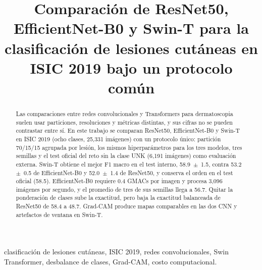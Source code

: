 \documentclass[conference]{IEEEtran}
\begin{document}

\title{Comparación de ResNet50, EfficientNet-B0 y Swin-T para la clasificación de lesiones cutáneas en ISIC 2019 bajo un protocolo común}

\author{
}

\maketitle

\begin{abstract}
Las comparaciones entre redes convolucionales y Transformers para dermatoscopia suelen usar particiones, resoluciones y métricas distintas, y sus cifras no se pueden contrastar entre sí. En este trabajo se comparan ResNet50, EfficientNet-B0 y Swin-T en ISIC 2019 (ocho clases, 25,331 imágenes) con un protocolo único: partición 70/15/15 agrupada por lesión, los mismos hiperparámetros para los tres modelos, tres semillas y el test oficial del reto sin la clase UNK (6,191 imágenes) como evaluación externa. Swin-T obtiene el mejor F1 macro en el test interno, 58.9~$\pm$~1.5, contra 53.2~$\pm$~0.5 de EfficientNet-B0 y 52.0~$\pm$~1.4 de ResNet50, y conserva el orden en el test oficial (58.5). EfficientNet-B0 requiere 0.4 GMACs por imagen y procesa 3,096 imágenes por segundo, y el promedio de tres de sus semillas llega a 56.7. Quitar la ponderación de clases sube la exactitud, pero baja la exactitud balanceada de ResNet50 de 58.4 a 48.7. Grad-CAM produce mapas comparables en las dos CNN y artefactos de ventana en Swin-T.
\end{abstract}

\renewcommand{\IEEEkeywordsname}{Palabras clave}
\begin{IEEEkeywords}
clasificación de lesiones cutáneas, ISIC 2019, redes convolucionales, Swin Transformer, desbalance de clases, Grad-CAM, costo computacional.
\end{IEEEkeywords}
\end{document}
